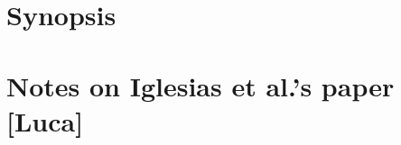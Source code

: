 \documentclass[\ifafour a4paper,12pt,\else a5paper,10pt,\fi%
onecolumn,oneside,article,%
british%
]{memoir}
\title{\propertitle}
\author{%
\hspace*{\stretch{1}}%
%
\parbox{1\linewidth}%
{\protect\centering various authors at MMIV-ML}%
%
\hspace*{\stretch{1}}%
}
\date{\firstpublished; updated \updated}
\theoremstyle{remark}
\theoremstyle{innote}
\newcommand*{\amp}{\&}
\newcommand*{\asudedication}[1]{%
{\par\centering\textit{#1}\par}}
\renewcommand*{\|}[1][]{\nonscript\,#1\vert\nonscript\;\mathopen{}}
\newcommand*{\etal}{{et al.}}
\begin{document}
\captiondelim{\quad}\captionnamefont{\footnotesize}\captiontitlefont{\footnotesize}
\frenchspacing
\maketitle

\abstractrunin
\abslabeldelim{}
\renewcommand*{\abstractname}{}
\setlength{\absleftindent}{0pt}
\setlength{\absrightindent}{0pt}
\setlength{\abstitleskip}{-\absparindent}
\frenchspacing





\section{Synopsis}
\label{sec:synopsis}




\section{Notes on Iglesias \etal's paper [Luca]}
\label{sec:notes_iglesiasetal}
\end{document}
